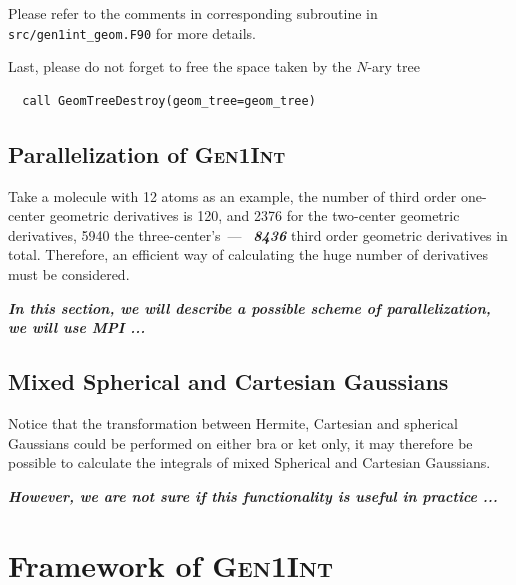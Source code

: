 \documentclass[a4paper,11pt,twoside,openright]{book}
\newcommand{\fixme}[1]{\textbf{\textit{\color{red} #1}}}
\begin{document}
Please refer to the comments in corresponding subroutine in \verb|src/gen1int_geom.F90| for more details.

Last, please do not forget to free the space taken by the $N$-ary tree
\begin{verbatim}
  call GeomTreeDestroy(geom_tree=geom_tree)
\end{verbatim}

\section{Parallelization of \textsc{Gen1Int}}
\label{sect:parallelization}

Take a molecule with 12 atoms as an example, the number of third order one-center
geometric derivatives is 120, and 2376 for the two-center geometric derivatives, 5940 the
three-center's~---~\fixme{8436} third order geometric derivatives in total. Therefore,
an efficient way of calculating the huge number of derivatives must be considered.

\fixme{In this section, we will describe a possible scheme of parallelization, we will use MPI ...}

\section{Mixed Spherical and Cartesian Gaussians}
\label{sect:mixed-gaussians}

Notice that the transformation between Hermite, Cartesian and spherical Gaussians
could be performed on either bra or ket only, it may therefore be possible to calculate
the integrals of mixed Spherical and Cartesian Gaussians.

\fixme{However, we are not sure if this functionality is useful in practice ...}

\chapter{Framework of \textsc{Gen1Int}}
\label{chap:framework}
\end{document}
